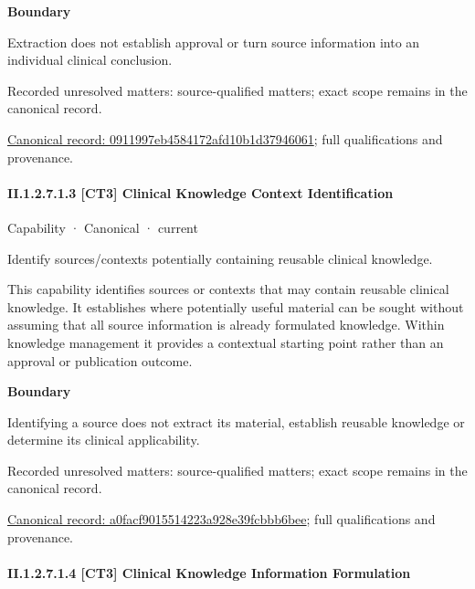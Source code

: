 \textbf{Boundary}



Extraction does not establish approval or turn source information into an individual clinical conclusion.


{\small Recorded unresolved matters: source-qualified matters; exact scope remains in the canonical record.}\par
{\footnotesize \href{../../../../continuum/strategy/capability/0911997eb4584172afd10b1d37946061.md}{Canonical record: 0911997eb4584172afd10b1d37946061}; full qualifications and provenance.}\par
\paragraph*{II.1.2.7.1.3 [CT3] Clinical Knowledge Context Identification}
\label{navigation:II.1.2.7.1.3}

\label{element:a0facf9015514223a928e39fcbbb6bee}
{\small Capability · Canonical · current}\par

Identify sources/contexts potentially containing reusable clinical knowledge.



This capability identifies sources or contexts that may contain reusable clinical knowledge. It establishes where potentially useful material can be sought without assuming that all source information is already formulated knowledge. Within knowledge management it provides a contextual starting point rather than an approval or publication outcome.



\textbf{Boundary}



Identifying a source does not extract its material, establish reusable knowledge or determine its clinical applicability.


{\small Recorded unresolved matters: source-qualified matters; exact scope remains in the canonical record.}\par
{\footnotesize \href{../../../../continuum/strategy/capability/a0facf9015514223a928e39fcbbb6bee.md}{Canonical record: a0facf9015514223a928e39fcbbb6bee}; full qualifications and provenance.}\par
\paragraph*{II.1.2.7.1.4 [CT3] Clinical Knowledge Information Formulation}
\label{navigation:II.1.2.7.1.4}

